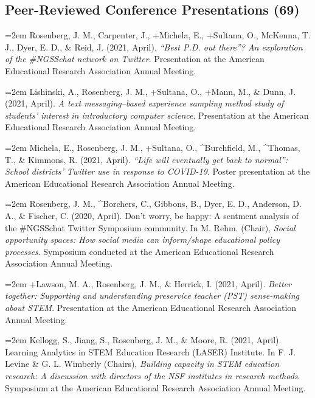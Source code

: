 \documentclass[
  14,
]{article}
\begin{document}
\hypertarget{peer-reviewed-conference-presentations-69}{%
\subsection{Peer-Reviewed Conference Presentations
(69)}\label{peer-reviewed-conference-presentations-69}}

\hangindent=2em Rosenberg, J. M., Carpenter, J., +Michela, E., +Sultana,
O., McKenna, T. J., Dyer, E. D., \& Reid, J. (2021, April). \emph{``Best
P.D. out there''? An exploration of the \#NGSSchat network on Twitter}.
Presentation at the American Educational Research Association Annual
Meeting.

\hangindent=2em Lishinski, A., Rosenberg, J. M., +Sultana, O., +Mann,
M., \& Dunn, J. (2021, April). \emph{A text messaging--based experience
sampling method study of students' interest in introductory computer
science}. Presentation at the American Educational Research Association
Annual Meeting.

\hangindent=2em Michela, E., Rosenberg, J. M., +Sultana, O.,
\^{}Burchfield, M., \^{}Thomas, T., \& Kimmons, R. (2021, April).
\emph{``Life will eventually get back to normal'': School districts'
Twitter use in response to COVID-19}. Poster presentation at the
American Educational Research Association Annual Meeting.

\hangindent=2em Rosenberg, J. M., \^{}Borchers, C., Gibbons, B., Dyer,
E. D., Anderson, D. A., \& Fischer, C. (2020, April). Don't worry, be
happy: A sentment analysis of the \#NGSSchat Twitter Symposium
community. In M. Rehm. (Chair), \emph{Social opportunity spaces: How
social media can inform/shape educational policy processes}. Symposium
conducted at the American Educational Research Association Annual
Meeting.

\hangindent=2em +Lawson, M. A., Rosenberg, J. M., \& Herrick, I. (2021,
April). \emph{Better together: Supporting and understanding preservice
teacher (PST) sense-making about STEM}. Presentation at the American
Educational Research Association Annual Meeting.

\hangindent=2em Kellogg, S., Jiang, S., Rosenberg, J. M., \& Moore, R.
(2021, April). Learning Analytics in STEM Education Research (LASER)
Institute. In F. J. Levine \& G. L. Wimberly (Chairs), \emph{Building
capacity in STEM education research: A discussion with directors of the
NSF institutes in research methods}. Symposium at the American
Educational Research Association Annual Meeting.
\end{document}
